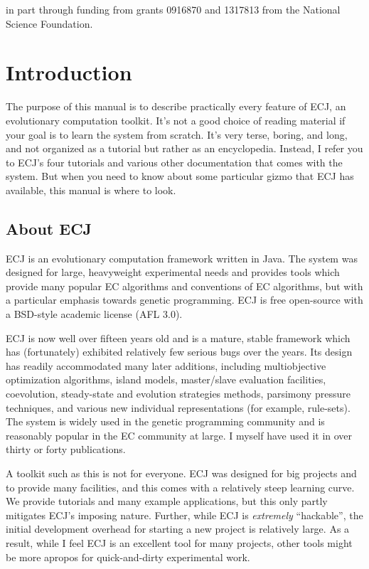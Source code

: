 \documentclass[twoside,10pt]{book}
\begin{document}
\vspace{0.15in}

 in part through funding from grants 0916870 and 1317813 from the National Science Foundation.

\normalsize
\cleardoublepage

\tableofcontents
\clearpage


\chapter{Introduction}

The purpose of this manual is to describe practically every feature of ECJ, an evolutionary computation toolkit.  It's not a good choice of reading material if your goal is to learn the system from scratch.  It's very terse, boring, and long, and not organized as a tutorial but rather as an encyclopedia.  Instead, I refer you to ECJ's four tutorials and various other documentation that comes with the system.  But when you need to know about some particular gizmo that ECJ has available, this manual is where to look.

\section{About ECJ}

ECJ is an evolutionary computation framework written in Java.  The system was designed for large, heavyweight experimental needs and provides tools which provide many popular EC algorithms and conventions of EC algorithms, but with a particular emphasis towards genetic programming. ECJ is free open-source with a BSD-style academic license (AFL 3.0).

ECJ is now well over fifteen years old and is a mature, stable framework which has (fortunately) exhibited relatively few serious bugs over the years.  Its design has readily accommodated many later additions, including multiobjective optimization algorithms, island models, master/slave evaluation facilities, coevolution, steady-state and evolution strategies methods, parsimony pressure techniques, and various new individual representations (for example, rule-sets). The system is widely used in the genetic programming community and is reasonably popular in the EC community at large. I myself have used it in over thirty or forty publications.

A toolkit such as this is not for everyone.  ECJ was designed for big projects and to provide many facilities, and this comes with a relatively steep learning curve.  We provide tutorials and many example applications, but this only partly mitigates ECJ's imposing nature.  Further, while ECJ is {\it extremely} ``hackable'', the initial development overhead for starting a new project is relatively large.  As a result, while I feel ECJ is an excellent tool for many projects, other tools might be more apropos for quick-and-dirty experimental work.
\end{document}
